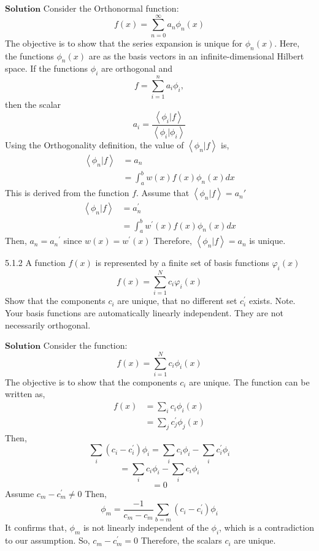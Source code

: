 $\boxed{\textbf{Solution}}$ Consider the Orthonormal function:
$$
f(x)=\sum_{n=0}^{\infty} a_{n} \phi_{n}(x)
$$
The objective is to show that the series expansion is unique for $\phi_{n}(x)$.
Here, the functions $\phi_{n}(x)$ are as the basis vectors in an infinite-dimensional Hilbert space.
If the functions $\phi_{i}$ are orthogonal and $$f=\sum_{i=1}^{n} a_{i} \phi_{i},$$ then the scalar $$a_{i}=\frac{\left\langle\phi_{i} | f\right\rangle}{\left\langle\phi_{i} | \phi_{i}\right\rangle}$$
Using the Orthogonality definition, the value of $\left\langle\phi_{n} | f\right\rangle$ is,
$$
\begin{aligned}
\left\langle\phi_{n} | f\right\rangle &=a_{n} \\
&=\int_{a}^{b} w(x) f(x) \phi_{n}(x) d x
\end{aligned}
$$
This is derived from the function $f$.
Assume that $\left\langle\phi_{n} | f\right\rangle=a_{n}'$
$$
\begin{aligned}
\left\langle\phi_{n} | f\right\rangle &=a_{n}^{\prime} \\
&=\int_{a}^{b} w^{\prime}(x) f(x) \phi_{n}(x) d x
\end{aligned}
$$
Then, $a_{n}=a_{n}{ }^{\prime}$ since $w(x)=w^{\prime}(x)$ Therefore, $\left\langle\phi_{n} | f\right\rangle=a_{n}$ is unique.


\newpage

\begin{mybox}{5.1.2}
A function $f(x)$ is represented by a finite set of basis functions $\varphi_{i}(x)$
$$
f(x)=\sum_{i=1}^{N} c_{i} \varphi_{i}(x)
$$
Show that the components $c_{i}$ are unique, that no different set $c_{i}^{\prime}$ exists.
Note. Your basis functions are automatically linearly independent. They are not necessarily orthogonal.
\end{mybox}
$\boxed{\textbf{Solution}}$ Consider the function:
$$f(x)=\sum_{i=1}^{N} c_{i} \phi_{i}(x)$$
The objective is to show that the components $c_{i}$ are unique.
The function can be written as,
$$
\begin{aligned}
f(x) &=\sum_{i} c_{i} \phi_{i}(x) \\
&=\sum_{j} c_{j}^{\prime} \phi_{j}(x)
\end{aligned}
$$
Then,
$$\sum_{i}\left(c_{i}-c_{i}^{\prime}\right) \phi_{i}=\sum_{i} c_{i} \phi_{i}-\sum_{i} c_{i}^{\prime} \phi_{i}$$
$$=\sum_{i} c_{i} \phi_{i}-\sum_{i} c_{i} \phi_{i}$$
$$=0$$
Assume $c_{m}-c_{m}^{\prime} \neq 0$ Then,
$$
\phi_{m}=\frac{-1}{c_{m}-c_{m}} \sum_{b=m}\left(c_{i}-c_{i}^{\prime}\right) \phi_{i}
$$
It confirms that, $\phi_{m}$ is not linearly independent of the $\phi_{i}$, which is a contradiction to our assumption. So, $c_{m}-c_{m}^{\prime}=0$ Therefore, the scalars $c_{i}$ are unique.

